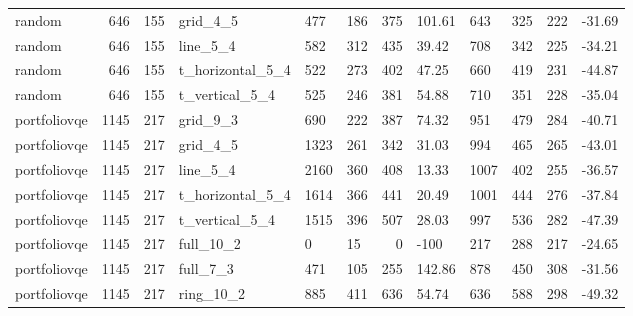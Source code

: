 \begin{longtable}{lrrlllrlllrl}
random & 646 & 155 & grid\_4\_5 & 477 & 186 & 375 & 101.61 & 643 & 325 & 222 & -31.69 \\
random & 646 & 155 & line\_5\_4 & 582 & 312 & 435 & 39.42 & 708 & 342 & 225 & -34.21 \\
random & 646 & 155 & t\_horizontal\_5\_4 & 522 & 273 & 402 & 47.25 & 660 & 419 & 231 & -44.87 \\
random & 646 & 155 & t\_vertical\_5\_4 & 525 & 246 & 381 & 54.88 & 710 & 351 & 228 & -35.04 \\
portfoliovqe & 1145 & 217 & grid\_9\_3 & 690 & 222 & 387 & 74.32 & 951 & 479 & 284 & -40.71 \\
portfoliovqe & 1145 & 217 & grid\_4\_5 & 1323 & 261 & 342 & 31.03 & 994 & 465 & 265 & -43.01 \\
portfoliovqe & 1145 & 217 & line\_5\_4 & 2160 & 360 & 408 & 13.33 & 1007 & 402 & 255 & -36.57 \\
portfoliovqe & 1145 & 217 & t\_horizontal\_5\_4 & 1614 & 366 & 441 & 20.49 & 1001 & 444 & 276 & -37.84 \\
portfoliovqe & 1145 & 217 & t\_vertical\_5\_4 & 1515 & 396 & 507 & 28.03 & 997 & 536 & 282 & -47.39 \\
portfoliovqe & 1145 & 217 & full\_10\_2 & 0 & 15 & 0 & -100 & 217 & 288 & 217 & -24.65 \\
portfoliovqe & 1145 & 217 & full\_7\_3 & 471 & 105 & 255 & 142.86 & 878 & 450 & 308 & -31.56 \\
portfoliovqe & 1145 & 217 & ring\_10\_2 & 885 & 411 & 636 & 54.74 & 636 & 588 & 298 & -49.32 \\
\end{longtable}
